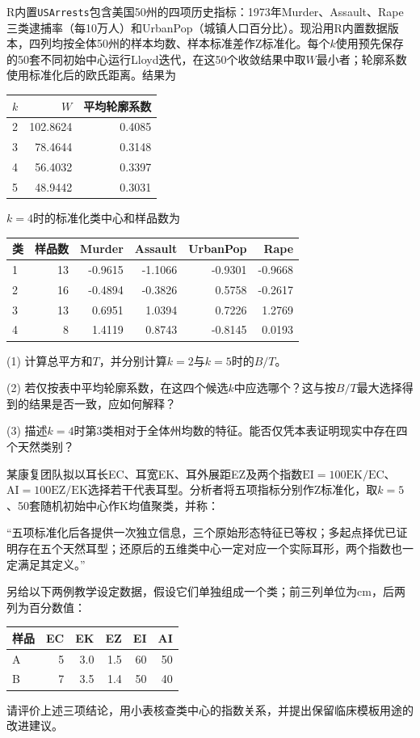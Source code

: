 R内置\texttt{USArrests}包含美国50州的四项历史指标：1973年Murder、Assault、Rape三类逮捕率（每10万人）和UrbanPop（城镇人口百分比）。现沿用R内置数据版本，四列均按全体50州的样本均数、样本标准差作Z标准化。每个$k$使用预先保存的50套不同初始中心运行Lloyd迭代，在这50个收敛结果中取$W$最小者；轮廓系数使用标准化后的欧氏距离。结果为\begin{center}\small\setlength{\tabcolsep}{5pt}
\begin{tabular}{@{}lrr@{}}
\toprule
$k$ & $W$ & 平均轮廓系数 \\
\midrule
2 & 102.8624 & 0.4085 \\
3 & 78.4644 & 0.3148 \\
4 & 56.4032 & 0.3397 \\
5 & 48.9442 & 0.3031 \\
\bottomrule
\end{tabular}
\end{center}$k=4$时的标准化类中心和样品数为\begin{center}\small\setlength{\tabcolsep}{5pt}
\begin{tabular}{@{}lrrrrr@{}}
\toprule
类 & 样品数 & Murder & Assault & UrbanPop & Rape \\
\midrule
1 & 13 & -0.9615 & -1.1066 & -0.9301 & -0.9668 \\
2 & 16 & -0.4894 & -0.3826 & 0.5758 & -0.2617 \\
3 & 13 & 0.6951 & 1.0394 & 0.7226 & 1.2769 \\
4 & 8 & 1.4119 & 0.8743 & -0.8145 & 0.0193 \\
\bottomrule
\end{tabular}
\end{center}\par (1) 计算总平方和$T$，并分别计算$k=2$与$k=5$时的$B/T$。\par (2) 若仅按表中平均轮廓系数，在这四个候选$k$中应选哪个？这与按$B/T$最大选择得到的结果是否一致，应如何解释？\par (3) 描述$k=4$时第3类相对于全体州均数的特征。能否仅凭本表证明现实中存在四个天然类别？

某康复团队拟以耳长EC、耳宽EK、耳外展距EZ及两个指数$\mathrm{EI}=100\mathrm{EK}/\mathrm{EC}$、$\mathrm{AI}=100\mathrm{EZ}/\mathrm{EK}$选择若干代表耳型。分析者将五项指标分别作Z标准化，取$k=5$、50套随机初始中心作K均值聚类，并称：\par “五项标准化后各提供一次独立信息，三个原始形态特征已等权；多起点择优已证明存在五个天然耳型；还原后的五维类中心一定对应一个实际耳形，两个指数也一定满足其定义。”\par 另给以下两例教学设定数据，假设它们单独组成一个类；前三列单位为cm，后两列为百分数值：\begin{center}\small\setlength{\tabcolsep}{5pt}
\begin{tabular}{@{}lrrrrr@{}}
\toprule
样品 & EC & EK & EZ & EI & AI \\
\midrule
A & 5 & 3.0 & 1.5 & 60 & 50 \\
B & 7 & 3.5 & 1.4 & 50 & 40 \\
\bottomrule
\end{tabular}
\end{center}请评价上述三项结论，用小表核查类中心的指数关系，并提出保留临床模板用途的改进建议。
